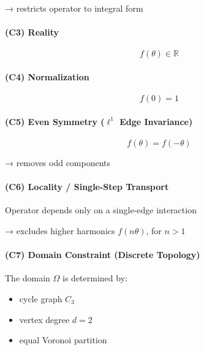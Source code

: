 \documentclass[
]{article}
\providecommand{\tightlist}{%
  \setlength{\itemsep}{0pt}\setlength{\parskip}{0pt}}
\begin{document}
→ restricts operator to integral form

\hypertarget{c3-reality}{%
\paragraph{(C3) Reality}\label{c3-reality}}

\[
f(\theta) \in \mathbb{R}
\]

\hypertarget{c4-normalization}{%
\paragraph{(C4) Normalization}\label{c4-normalization}}

\[
f(0) = 1
\]

\hypertarget{c5-even-symmetry-ell1-edge-invariance}{%
\paragraph{\texorpdfstring{(C5) Even Symmetry (\(\ell^1\) Edge
Invariance)}{(C5) Even Symmetry (\textbackslash ell\^{}1 Edge Invariance)}}\label{c5-even-symmetry-ell1-edge-invariance}}

\[
f(\theta) = f(-\theta)
\]

→ removes odd components

\hypertarget{c6-locality-single-step-transport}{%
\paragraph{(C6) Locality / Single-Step
Transport}\label{c6-locality-single-step-transport}}

Operator depends only on a single-edge interaction

→ excludes higher harmonics \(f(n\theta)\), for \(n > 1\)

\hypertarget{c7-domain-constraint-discrete-topology}{%
\paragraph{(C7) Domain Constraint (Discrete
Topology)}\label{c7-domain-constraint-discrete-topology}}

The domain \(\Omega\) is determined by:

\begin{itemize}
\tightlist
\item
  cycle graph \(C_3\)
\item
  vertex degree \(d = 2\)
\item
  equal Voronoi partition
\end{itemize}
\end{document}
